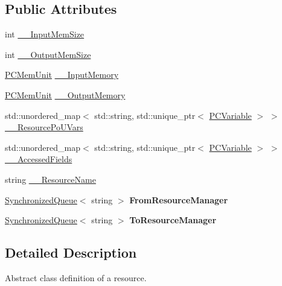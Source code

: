 \subsection*{Public Attributes}
\begin{DoxyCompactItemize}
\item 
int \hyperlink{classpc__emulator_1_1PCResource_afb2356d0dcf4db0b6a04302861a26f18}{\+\_\+\+\_\+\+Input\+Mem\+Size}
\item 
int \hyperlink{classpc__emulator_1_1PCResource_a9b24906c7b1fcaee0ce72018c75bae9f}{\+\_\+\+\_\+\+Output\+Mem\+Size}
\item 
\hyperlink{classpc__emulator_1_1PCMemUnit}{P\+C\+Mem\+Unit} \hyperlink{classpc__emulator_1_1PCResource_a8581fead293ac0f5218bbc4de5241999}{\+\_\+\+\_\+\+Input\+Memory}
\item 
\hyperlink{classpc__emulator_1_1PCMemUnit}{P\+C\+Mem\+Unit} \hyperlink{classpc__emulator_1_1PCResource_aa70b08417c498d378158b048915ff8c0}{\+\_\+\+\_\+\+Output\+Memory}
\item 
std\+::unordered\+\_\+map$<$ std\+::string, std\+::unique\+\_\+ptr$<$ \hyperlink{classpc__emulator_1_1PCVariable}{P\+C\+Variable} $>$ $>$ \hyperlink{classpc__emulator_1_1PCResource_aead21e358bfd79dd6344c34980d51d5c}{\+\_\+\+\_\+\+Resource\+Po\+U\+Vars}
\item 
std\+::unordered\+\_\+map$<$ std\+::string, std\+::unique\+\_\+ptr$<$ \hyperlink{classpc__emulator_1_1PCVariable}{P\+C\+Variable} $>$ $>$ \hyperlink{classpc__emulator_1_1PCResource_acb5216de1a9e614bea458ad69564aa93}{\+\_\+\+\_\+\+Accessed\+Fields}
\item 
string \hyperlink{classpc__emulator_1_1PCResource_a2ef3a8a76df532cdb7d913ee83ff67c8}{\+\_\+\+\_\+\+Resource\+Name}
\item 
\hyperlink{classSynchronizedQueue}{Synchronized\+Queue}$<$ string $>$ {\bfseries From\+Resource\+Manager}\hypertarget{classpc__emulator_1_1PCResource_a0cf5adef930125e34a498d24e40b1a65}{}\label{classpc__emulator_1_1PCResource_a0cf5adef930125e34a498d24e40b1a65}

\item 
\hyperlink{classSynchronizedQueue}{Synchronized\+Queue}$<$ string $>$ {\bfseries To\+Resource\+Manager}\hypertarget{classpc__emulator_1_1PCResource_a3c76bf17afea09afcd7ceb135bae0b89}{}\label{classpc__emulator_1_1PCResource_a3c76bf17afea09afcd7ceb135bae0b89}

\end{DoxyCompactItemize}


\subsection{Detailed Description}
Abstract class definition of a resource. 

